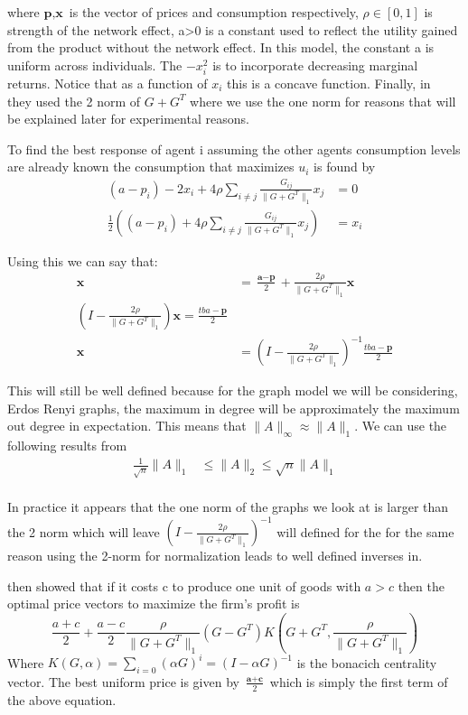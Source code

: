 \documentclass[12pt]{article}
\newcommand{\tb}[1]{\textbf{#1}}
\begin{document}
 where $\tb{p}, \tb{x}$ is the vector of prices and consumption respectively, $\rho \in [0,1]$ is strength of the network effect, a>0 is a constant used to reflect the utility gained from the product without the network effect. In this model, the constant a is uniform across individuals. The $-x_{i}^{2}$ is to incorporate decreasing marginal returns. Notice that as a function of $x_{i}$ this is a concave function. Finally, in~\cite{huang2021value} they used the 2 norm of $G+G^{T}$ where we use the one norm for reasons that will be explained later for experimental reasons.

 To find the best response of agent i assuming the other agents consumption levels are already known the consumption that maximizes $u_{i}$ is found by
 \begin{align*}
   (a-p_{i}) - 2x_{i} + 4\rho \sum_{i \neq j} \frac{G_{ij}}{\|G+G^{T}\|_{1}} x_{j} &= 0 \\
   \frac{1}{2}\left( (a-p_{i}) + 4\rho \sum_{i \neq j} \frac{G_{ij}}{\|G+G^{T}\|_{1}} x_{j}\right) &= x_{i}
 \end{align*}

 Using this we can say that:
 \begin{align*}
   \tb{x} &=  \frac{\tb{a}-\tb{p}}{2} +  \frac{2\rho}{\|G+G^T\|_{1}} \tb{x}  \\
   (I - \frac{2\rho}{\|G+G^T\|_{1}} ) \tb{x} = \frac{tb{a}-\tb{p}}{2} \\
   \tb{x} &= (I - \frac{2\rho}{\|G+G^T\|_{1}} )^{-1}   \frac{tb{a}-\tb{p}}{2}
 \end{align*}

 This will still be well defined because for the graph model we will be considering, Erdos Renyi graphs, the maximum in degree will be approximately the maximum out degree in expectation. This means that $\|A\|_{\infty}\approx \|A\|_{1}$.  We can use the following results from~\cite{van1996matrix}
 \begin{align}
   \frac{1}{\sqrt{n}} \| A\|_{1} &\leq \| A\|_{2} \leq \sqrt{n} \|A \|_{1}\label{eq:model2}\\
\end{align}

In practice it appears that the one norm of the graphs we look at is larger than the 2 norm which will leave $(I - \frac{2\rho}{\|G+G^{T}\|_{1}})^{-1}$ will defined for the for the same reason using the 2-norm for normalization leads to well defined inverses in\cite{huang2021value}.

  \cite{candogan2012optimal} then showed that if it costs c to produce one unit of goods with $a > c$ then the optimal price vectors to maximize the firm's profit is
  \begin{equation}
   \frac{a+c}{2} + \frac{a-c}{2}\frac{\rho}{\|G + G^{T}\|_{1}} (G - G^{T}) K(G+G^{T}, \frac{\rho}{\|G+G^{T}\|_{1}})
 \end{equation}
  Where $K(G, \alpha) = \sum_{i=0} (\alpha G)^{i} = (I - \alpha G)^{-1}$ is the bonacich centrality vector.
  The best uniform price is given by $\frac{\tb{a} + \tb{c}}{2}$ which is simply the first term of the above equation.
\end{document}
